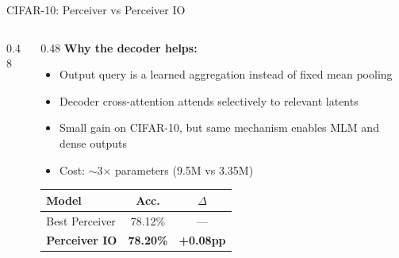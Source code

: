 \documentclass[aspectratio=169,11pt]{beamer}
\begin{document}
\begin{frame}[shrink=5]{CIFAR-10: Perceiver vs Perceiver IO}
  \begin{columns}[T]
    \begin{column}{0.48\textwidth}
      \begin{center}
      \end{center}
    \end{column}
    \begin{column}{0.48\textwidth}
      \textbf{Why the decoder helps:}
      \begin{itemize}
        \item Output query is a learned aggregation instead of fixed mean pooling
        \item Decoder cross-attention attends selectively to relevant latents
        \item Small gain on CIFAR-10, but same mechanism enables MLM and dense outputs
        \item Cost: $\sim$3$\times$ parameters (9.5M vs 3.35M)
      \end{itemize}

      \vspace{0.4em}
      \begin{table}
        \centering\small
        \begin{tabular}{lcc}
          \toprule
          \textbf{Model} & \textbf{Acc.} & \textbf{$\Delta$} \\
          \midrule
          Best Perceiver & 78.12\% & --- \\
          \textbf{Perceiver IO} & \textbf{78.20\%} & \textcolor{AccentGreen}{\textbf{+0.08pp}} \\
          \bottomrule
        \end{tabular}
      \end{table}
    \end{column}
  \end{columns}
\end{frame}
\end{document}
